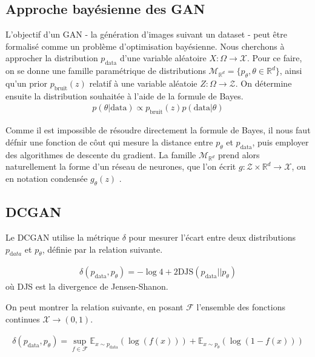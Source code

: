 \subsection{Approche bayésienne des GAN}
L'objectif d'un GAN - la génération d'images suivant un dataset - peut être formalisé comme un problème d'optimisation bayésienne. Nous cherchons à approcher la distribution $p_{\mathrm{data}}$ d'une variable aléatoire $X: \Omega \longrightarrow \mathcal{X}$. Pour ce faire, on se donne une famille paramétrique de distributions $\mathcal{M}_{\mathbb{R}^{d}} = \{p_{\theta}, \theta \in \mathbb{R}^d\}$, ainsi qu'un prior $p_{\mathrm{bruit}}(z)$ relatif à une variable aléatoie $Z : \Omega \longrightarrow \mathcal{Z}$. On détermine ensuite la distribution souhaitée à l'aide de la formule de Bayes. $$\begin{aligned} p(\theta | \mathrm{data}) \propto p_{\mathrm{bruit}}(z)p(\mathrm{data}|\theta)\end{aligned}$$

Comme il est impossible de résoudre directement la formule de Bayes, il nous faut défnir une fonction de côut qui mesure la distance entre $p_{\theta}$ et $p_{\mathrm{data}}$, puis employer des algorithmes de descente du gradient. La famille $\mathcal{M}_{\mathbb{R}^d}$ prend alors naturellement la forme d'un réseau de neurones, que l'on écrit $g : \mathcal{Z} \times \mathbb{R}^{d} \longrightarrow \mathcal{X}$, ou en notation condensée $g_{\theta}(z)$ .

\subsection{DCGAN} \label{DCGAN_prob}

Le DCGAN utilise la métrique $\delta$ pour mesurer l'écart entre deux distributions $p_{\mathrm data}$ et $p_{\theta}$, définie par la relation suivante. 

$$\begin{aligned} \delta(p_{\mathrm{data}}, p_{\theta}) = -\log 4 + 2 \mathrm{DJS}(p_{\mathrm{data}} || p_{\theta})\end{aligned}$$ où DJS est la divergence de Jensen-Shanon.

On peut montrer \cite{goodfellow_generative_2014} la relation suivante, en posant $\mathcal{F}$ l'ensemble des fonctions continues $\mathcal{X} \longrightarrow (0,1)$.

$$\begin{aligned} \delta(p_{\mathrm{data}}, p_{\theta}) = \sup_{f\in\mathcal{F}} \mathbb{E}_{x \sim p_{\mathrm{data}}}(\log (f(x))) + \mathbb{E}_{x \sim p_{\theta}}(\log (1 - f(x)))\end{aligned}$$

